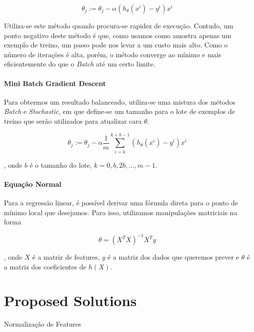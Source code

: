 \documentclass[conference]{IEEEtran}
\begin{document}
\begin{equation} \label{eq:stochastic_descent}
\theta_{j} := \theta_{j} - \alpha(h_{\theta}(x^{i}) - y^{i}) x^{i}
\end{equation}

Utiliza-se este método quando procura-se rapidez de execução. Contudo, um ponto negativo deste método é que, como usamos como amostra apenas um exemplo de treino, um passo pode nos levar a um custo mais alto. Como o número de iterações é alta, porém, o método converge ao mínimo e mais eficientemente do que o \textit{Batch} até um certo limite.

\paragraph{Mini Batch Gradient Descent}

Para obtermos um resultado balanceado, utiliza-se uma mistura dos métodos \textit{Batch} e \textit{Stochastic}, em que define-se um tamanho para o lote de exemplos de treino que serão utilizados para atualizar cara $\theta$.

\begin{equation} \label{eq:stochastic_descent}
\theta_{j} := \theta_{j} - \alpha \dfrac{1}{m} \sum_{i=k}^{k+b-1}(h_{\theta}(x^{i}) - y^{i}) x^{i}
\end{equation}

, onde $b$ é o tamanho do lote, $k = 0, b, 2b, ..., m-1$.

\paragraph{Equação Normal}

Para a regressão linear, é possível derivar uma fórmula direta para o ponto de mínimo local que desejamos. Para isso, utilizamos manipulações matriciais na forma

\begin{equation} \label{eq:normal}
\theta = (X^{T}X)^{-1}X^{T}y
\end{equation}

, onde $X$ é a matriz de features, $y$ é a matriz dos dados que queremos prever e $\theta$ é a matriz dos coeficientes de $h(X)$.

\section{Proposed Solutions}

Normalização de Features
\end{document}
